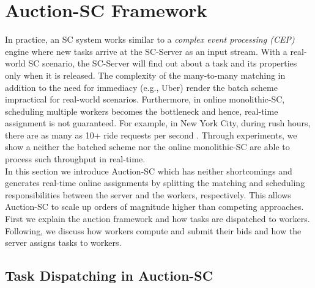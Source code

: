 \section{Auction-SC Framework}
\label{sec:onlinealgo}

In practice, an SC system works similar to a \emph{complex event processing (CEP)} engine \cite{Luckham01} where new tasks arrive at the SC-Server as an input stream. With a real-world SC scenario, the SC-Server will find out about a task and its properties only when it is released. The complexity of the many-to-many matching in addition to the need for immediacy (e.g., Uber) render the batch scheme impractical for real-world scenarios. Furthermore, in online monolithic-SC, scheduling multiple workers becomes the bottleneck and hence, real-time assignment is not guaranteed. For example, in New York City, during rush hours, there are as many as 10+ ride requests per second \cite{NYCTaxi}. Through experiments, we show a neither the batched scheme nor the online monolithic-SC are able to process such throughput in real-time.\\

In this section we introduce Auction-SC which has neither shortcomings and generates real-time online assignments by splitting the matching and scheduling responsibilities between the server and the workers, respectively. This allows Auction-SC to scale up orders of magnitude higher than competing approaches. First we explain the auction framework and how tasks are dispatched to workers. Following, we discuss how workers compute and submit their bids and how the server assigns tasks to workers.

\subsection{Task Dispatching in Auction-SC}


